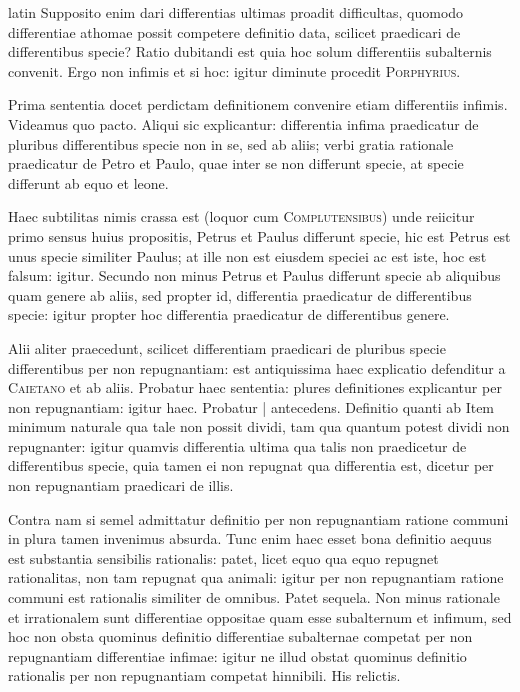 \begin{otherlanguage*}{latin}
\pstart
Supposito enim dari differentias ultimas proadit difficultas, quomodo differentiae athomae possit competere definitio data, scilicet praedicari de differentibus specie? Ratio dubitandi est quia hoc solum differentiis subalternis convenit. Ergo non infimis et si hoc:
igitur diminute procedit \textsc{Porphyrius}. 
\pend

\pstart
Prima sententia docet perdictam definitionem convenire etiam differentiis infimis. Videamus quo pacto. Aliqui sic explicantur:
differentia infima praedicatur de pluribus differentibus specie non in se, sed ab aliis; verbi gratia rationale praedicatur de Petro et Paulo, quae inter se non differunt specie, at specie differunt ab equo et leone. 
\pend

\pstart
Haec subtilitas nimis crassa est (loquor cum \textsc{Complutensibus}\index[persons]{}) unde reiicitur primo sensus huius propositis, Petrus et Paulus differunt specie, hic est Petrus est unus specie similiter Paulus; at ille non est eiusdem speciei ac est iste, hoc est falsum:
igitur. Secundo non minus Petrus et Paulus differunt specie ab aliquibus quam genere ab aliis, sed propter id, differentia praedicatur de differentibus specie:
igitur propter hoc differentia praedicatur de differentibus genere. 
\pend

\pstart
Alii aliter praecedunt, scilicet differentiam praedicari de pluribus specie differentibus per non repugnantiam:
est antiquissima haec explicatio defenditur a \textsc{Caietano} et ab aliis. Probatur haec sententia:
plures definitiones explicantur per non repugnantiam:
igitur haec. Probatur \textnormal{|} antecedens. Definitio quanti ab  Item minimum naturale qua tale non possit dividi, tam qua quantum potest dividi non repugnanter:
igitur quamvis differentia ultima qua talis non praedicetur de differentibus specie, quia tamen ei non repugnat qua differentia est, dicetur per non repugnantiam praedicari de illis. 
\pend

\pstart
Contra nam si semel admittatur definitio per non repugnantiam ratione communi in plura tamen invenimus absurda. Tunc enim haec esset bona definitio aequus est substantia sensibilis rationalis:
patet, licet equo qua equo repugnet rationalitas, non tam repugnat qua animali:
igitur per non repugnantiam ratione communi est rationalis similiter de omnibus. Patet sequela. Non minus rationale et irrationalem sunt differentiae oppositae quam esse subalternum et infimum, sed hoc non obsta quominus definitio differentiae subalternae competat per non repugnantiam differentiae infimae:
igitur ne illud obstat quominus definitio rationalis per non repugnantiam competat hinnibili. His relictis. 
\pend


\end{otherlanguage*}
